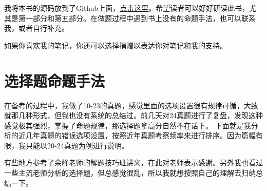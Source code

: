 \documentclass[lang=cn,blue,10pt,scheme=chinese,twocol]{zznote}
\begin{document}
{	我将本书的源码放到了Github上面，\href{https://github.com/xubenshan/zznote}{点击这里}。希望读者可以好好研读此书，尤其是第一部分和第五部分。在做题过程中遇到书上没有的命题手法，也可以联系我，或者自行补充。

	如果你喜欢我的笔记，你还可以选择捐赠以表达你对笔记和我的支持。
	\begin{figure}[htbp]
		\centering

		\caption*{}

	\end{figure}


}


\tableofcontents

\mainmatter

\chapter{选择题命题手法}


在备考的过程中，我做了10-23的真题，感觉里面的选项设置很有规律可循，大致就那几种形式，但我也没有系统的总结过。前几天对24真题进行了复盘，发现这种感觉极其强烈，掌握了命题规律，那选择题拿高分自然不在话下。
下面就是我分析的近几年真题的错误选项设置，按照近年真题考察频率来进行排序。因为篇幅有限，我只能以20-24真题为例进行说明。

\vspace{0.5em}

\begin{remark}
	有些地方参考了余峰老师的解题技巧班讲义，在此对老师表示感谢。另外我也看过一些主流老师分析的选择题，但总感觉很乱，所以我就想按照自己的理解去归纳总结一下。
\end{remark}
\end{document}
